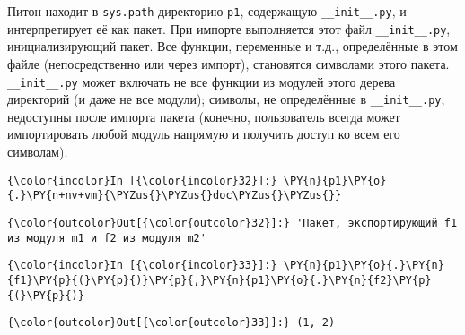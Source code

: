     Питон находит в \texttt{sys.path} директорию \texttt{p1}, содержащую
\texttt{\_\_init\_\_.py}, и интерпретирует её как пакет. При импорте
выполняется этот файл \texttt{\_\_init\_\_.py}, инициализирующий пакет.
Все функции, переменные и т.д., определённые в этом файле
(непосредственно или через импорт), становятся символами этого пакета.
\texttt{\_\_init\_\_.py} может включать не все функции из модулей этого
дерева директорий (и даже не все модули); символы, не определённые в
\texttt{\_\_init\_\_.py}, недоступны после импорта пакета (конечно,
пользователь всегда может импортировать любой модуль напрямую и получить
доступ ко всем его символам).

    \begin{Verbatim}[commandchars=\\\{\}]
{\color{incolor}In [{\color{incolor}32}]:} \PY{n}{p1}\PY{o}{.}\PY{n+nv+vm}{\PYZus{}\PYZus{}doc\PYZus{}\PYZus{}}
\end{Verbatim}

            \begin{Verbatim}[commandchars=\\\{\}]
{\color{outcolor}Out[{\color{outcolor}32}]:} 'Пакет, экспортирующий f1 из модуля m1 и f2 из модуля m2'
\end{Verbatim}
        
    \begin{Verbatim}[commandchars=\\\{\}]
{\color{incolor}In [{\color{incolor}33}]:} \PY{n}{p1}\PY{o}{.}\PY{n}{f1}\PY{p}{(}\PY{p}{)}\PY{p}{,}\PY{n}{p1}\PY{o}{.}\PY{n}{f2}\PY{p}{(}\PY{p}{)}
\end{Verbatim}

            \begin{Verbatim}[commandchars=\\\{\}]
{\color{outcolor}Out[{\color{outcolor}33}]:} (1, 2)
\end{Verbatim}
